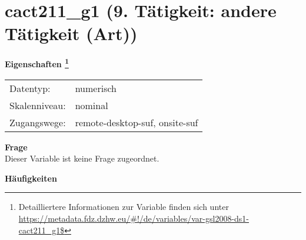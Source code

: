 
    \setcounter{footnote}{0}

    \vspace*{-1.8cm}
	\section{cact211\_g1 (9. Tätigkeit: andere Tätigkeit (Art))}
	\label{section:cact211_g1}



    \vspace*{0.5cm}
    \noindent\textbf{Eigenschaften
	\footnote{Detailliertere Informationen zur Variable finden sich unter
		\url{https://metadata.fdz.dzhw.eu/\#!/de/variables/var-gsl2008-ds1-cact211_g1$}}}\\
	\begin{tabularx}{\hsize}{@{}lX}
	Datentyp: & numerisch \\
	Skalenniveau: & nominal \\
	Zugangswege: &
	  remote-desktop-suf, 
	  onsite-suf
 \\
    \end{tabularx}



		\vspace*{0.5cm}
		\noindent\textbf{Frage}\\
		Dieser Variable ist keine Frage zugeordnet.





        		\vspace*{0.5cm}
                \noindent\textbf{Häufigkeiten}

